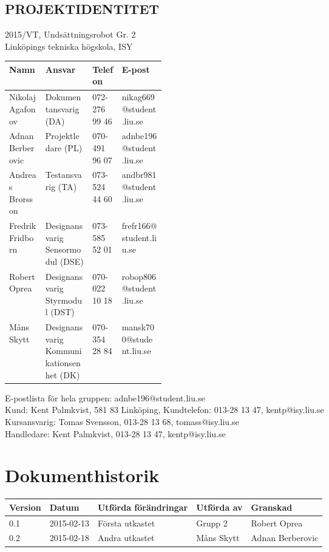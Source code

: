 \documentclass[11pt]{article}
\begin{document}
\pagebreak
\begin{center}

\section*{PROJEKTIDENTITET}
2015/VT, Undsättningsrobot Gr. 2
\\
Linköpings tekniska högskola, ISY
\\[0.5in]
\begin{table}[h]
\begin{tabular}{|l|p{0.3\linewidth}|l|l|} \hline
Namn & Ansvar & Telefon & E-post \\[0.1in] \hline
Nikolaj Agafonov & Dokumentansvarig (DA) & 072-276 99 46 & nikag669@student.liu.se \\ \hline
Adnan Berberovic & Projektledare (PL) & 070-491 96 07 & adnbe196@student.liu.se \\ \hline
Andreas Brorsson & Testansvarig (TA) & 073-524 44 60 & andbr981@student.liu.se \\ \hline
Fredrik Fridborn & Designansvarig Sensormodul (DSE) & 073-585 52 01 & frefr166@student.liu.se \\ \hline
Robert Oprea & Designansvarig Styrmodul (DST) & 070-022 10 18 & robop806@student.liu.se \\ \hline
Måns Skytt & Designansvarig Kommunikationsenhet (DK) & 070-354 28 84 & mansk700@student.liu.se \\ \hline
\end{tabular}
\end{table}

E-postlista för hela gruppen: adnbe196@student.liu.se
\\[1in]
Kund: Kent Palmkvist, 581 83 Linköping,
Kundtelefon: 013-28 13 47, kentp@isy.liu.se
\\[1in]
Kursansvarig: Tomas Svensson, 013-28 13 68, tomass@isy.liu.se
\\
Handledare: Kent Palmkvist, 013-28 13 47, kentp@isy.liu.se
\end{center}
\pagebreak

\tableofcontents

\pagebreak

\section*{Dokumenthistorik}
\begin{table}[h]
\begin{tabular}{|l|l|l|l|l|} \hline

Version & 
Datum & 
Utförda förändringar & 
Utförda av & 
Granskad \\[0.1in] \hline
0.1 &
2015-02-13 & 
Första utkastet & 
Grupp 2 & 
Robert Oprea \\ \hline

0.2 &
2015-02-18 & 
Andra utkastet & 
Måns Skytt& 
Adnan Berberovic \\ \hline

\end{tabular}
\end{table}
\end{document}
